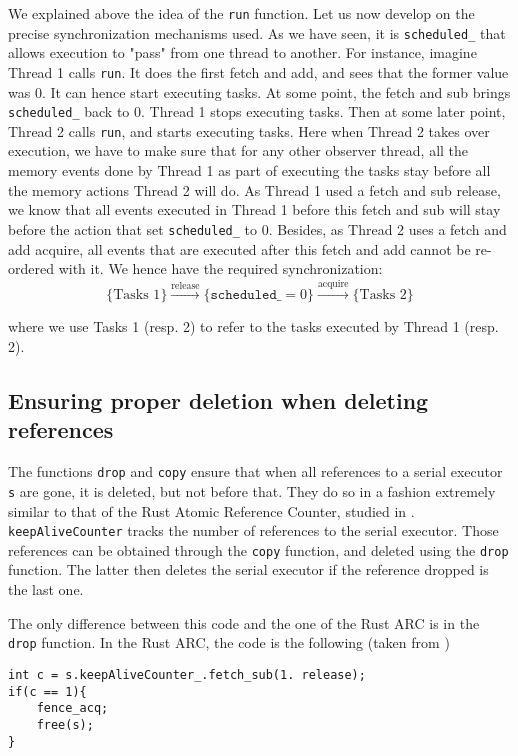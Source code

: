 We explained above the idea of the \texttt{run} function. Let us now develop on the precise synchronization mechanisms used. As we have seen, it is \texttt{scheduled\_} that allows execution to "pass" from one thread to another. For instance, imagine Thread 1 calls \texttt{run}. It does the first fetch and add, and sees that the former value was 0. It can hence start executing tasks. At some point, the fetch and sub brings \texttt{scheduled\_} back to 0. Thread 1 stops executing tasks. Then at some later point, Thread 2 calls \texttt{run}, and starts executing tasks. Here when Thread 2 takes over execution, we have to make sure that for any other observer thread, all the memory events done by Thread 1 as part of executing the tasks stay before all the memory actions Thread 2 will do. As Thread 1 used a fetch and sub release, we know that all events executed in Thread 1 before this fetch and sub will stay before the action that set \texttt{scheduled\_} to 0. Besides, as Thread 2 uses a fetch and add acquire, all events that are executed after this fetch and add cannot be re-ordered with it. We hence have the required synchronization:
\[
				\{\text{Tasks 1}\} 
				\xrightarrow{\text{release}} 
				\{\mathtt{scheduled\_} = 0\} 
				\xrightarrow{\text{acquire}} 
				\{\text{Tasks 2}\}
		\]

where we use Tasks 1 (resp. 2) to refer to the tasks executed by Thread 1 (resp. 2).

\subsection{Ensuring proper deletion when deleting references}
The functions \texttt{drop} and \texttt{copy} ensure that when all references to a serial executor \texttt{s} are gone, it is deleted, but not before that. They do so in a fashion extremely similar to that of the Rust Atomic Reference Counter, studied in \cite{fsl}. \texttt{keepAliveCounter} tracks the number of references to the serial executor. Those references can be obtained through the \texttt{copy} function, and deleted using the \texttt{drop} function. The latter then deletes the serial executor if the reference dropped is the last one. 

The only difference between this code and the one of the Rust ARC is in the \texttt{drop} function. In the Rust ARC, the code is the following (taken from \cite{fsl})

\begin{lstlisting}
int c = s.keepAliveCounter_.fetch_sub(1. release);
if(c == 1){
	fence_acq;
	free(s);
}
\end{lstlisting}


